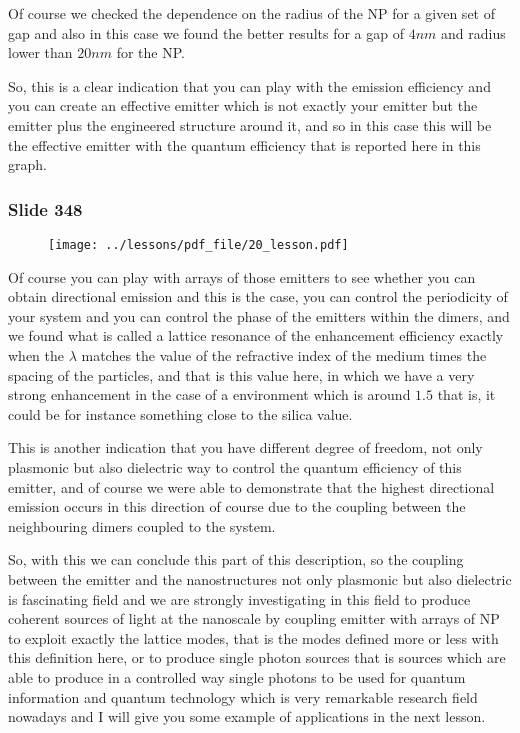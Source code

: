 \documentclass[../main/main.tex]{subfiles}
\begin{document}
Of course we checked the dependence on the radius of the NP for a given set of gap and also in this case we found the better results for a gap of $4 nm$ and radius lower than $20 nm$ for the NP. 

So, this is a clear indication that you can play with the emission efficiency and you can create an effective emitter which is not exactly your emitter but the emitter plus the engineered structure around it, and so in this case this will be the effective emitter with the quantum efficiency that is reported here in this graph.


\newpage

\subsubsection{Slide 348}

\begin{figure}[h!]
\centering
\texttt{[image: ../lessons/pdf\_file/20\_lesson.pdf]}
\end{figure}

Of course you can play with arrays of those emitters to see whether you can obtain directional emission and this is the case, you can control the periodicity of your system and you can control the phase of the emitters within the dimers, and we found what is called a lattice resonance of the enhancement efficiency exactly when the $\lambda$ matches the value of the refractive index of the medium times the spacing of the particles, and that is this value here, in which we have a very strong enhancement in the case of a environment which is around $1.5$ that is, it could be for instance something close to the silica value.

This is another indication that you have different degree of freedom, not only plasmonic but also dielectric way to control  the quantum efficiency of this emitter, and of course we were able to demonstrate that the highest directional emission occurs in this direction of course due to the coupling between the neighbouring dimers coupled to the system.

So, with this we can conclude this part of this description, so the coupling between the emitter and the nanostructures not only plasmonic but also dielectric is fascinating field and we are strongly investigating in this field to produce coherent sources of light at the nanoscale by coupling emitter with arrays of NP to exploit exactly the lattice modes, that is the modes defined more or less with this definition here, or to produce single photon sources that is sources which are able to produce in a controlled way single photons to be used for quantum information and quantum technology which is very remarkable research field nowadays and I will give you some example of applications in the next lesson.



\clearpage
\end{document}
